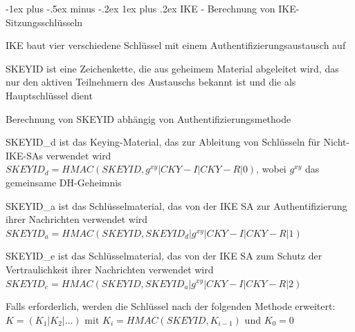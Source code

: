 \documentclass[a4paper]{article}
\makeatletter
\renewcommand{\subsubsection}{\@startsection{subsubsection}{3}{0mm}%
 {-1ex plus -.5ex minus -.2ex}%
 {1ex plus .2ex}%
 {\normalfont\small\bfseries}}
\makeatother
\begin{document}
\begin{multicols}{3}
      \subsubsection{IKE - Berechnung von IKE-Sitzungsschlüsseln}
      \begin{itemize*}
            \item IKE baut vier verschiedene Schlüssel mit einem Authentifizierungsaustausch auf
            \item SKEYID ist eine Zeichenkette, die aus geheimem Material abgeleitet wird, das nur den aktiven Teilnehmern des Austauschs bekannt ist und die als Hauptschlüssel dient
            \item Berechnung von SKEYID abhängig von Authentifizierungsmethode
            \item SKEYID\_d ist das Keying-Material, das zur Ableitung von Schlüsseln für Nicht-IKE-SAs verwendet wird $SKEYID_d = HMAC(SKEYID, g^{xy} | CKY-I | CKY-R | 0)$, wobei $g^{xy}$ das gemeinsame DH-Geheimnis
            \item SKEYID\_a ist das Schlüsselmaterial, das von der IKE SA zur Authentifizierung ihrer Nachrichten verwendet wird $SKEYID_a = HMAC(SKEYID, SKEYID_d | g^{xy} | CKY-I | CKY-R | 1)$
            \item SKEYID\_e ist das Schlüsselmaterial, das von der IKE SA zum Schutz der Vertraulichkeit ihrer Nachrichten verwendet wird $SKEYID_e = HMAC(SKEYID, SKEYID_a | g^{xy} | CKY-I | CKY-R | 2)$
            \item Falls erforderlich, werden die Schlüssel nach der folgenden Methode erweitert: $K=(K_1 | K_2 | ...)$ mit $K_i = HMAC(SKEYID, K_{i-1})$ und $K_0 = 0$
      \end{itemize*}


\end{multicols}
\end{document}
